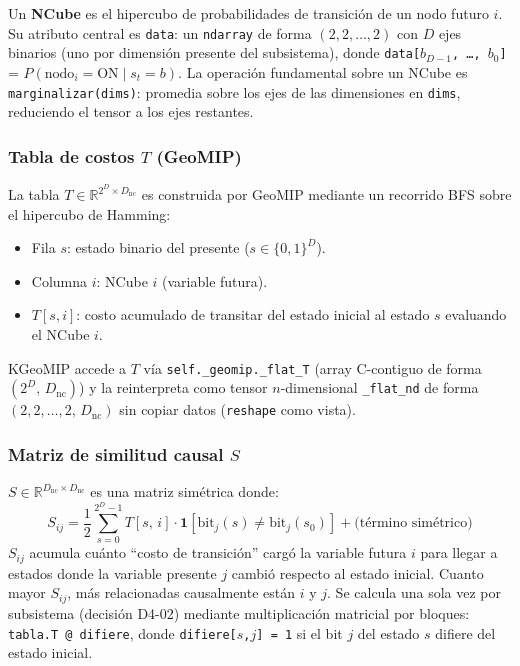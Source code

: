 Un \textbf{NCube} es el hipercubo de probabilidades de transición de un nodo futuro $i$.
Su atributo central es \texttt{data}: un \texttt{ndarray} de forma $(2, 2, \ldots, 2)$
con $D$ ejes binarios (uno por dimensión presente del subsistema), donde
\texttt{data[$b_{D-1}$, \ldots, $b_0$]} = $P(\text{nodo}_i = \text{ON} \mid s_t = b)$.
La operación fundamental sobre un NCube es \texttt{marginalizar(dims)}: promedia
sobre los ejes de las dimensiones en \texttt{dims}, reduciendo el tensor a los ejes
restantes.

\subsubsection*{Tabla de costos $T$ (GeoMIP)}

La tabla $T \in \mathbb{R}^{2^D \times D_{\text{nc}}}$ es construida por GeoMIP
mediante un recorrido BFS sobre el hipercubo de Hamming:
\begin{itemize}
  \item Fila $s$: estado binario del presente ($s \in \{0,1\}^D$).
  \item Columna $i$: NCube $i$ (variable futura).
  \item $T[s, i]$: costo acumulado de transitar del estado inicial al estado $s$
        evaluando el NCube $i$.
\end{itemize}
KGeoMIP accede a $T$ vía \texttt{self.\_geomip.\_flat\_T} (array C-contiguo de forma
$(2^D,\, D_{\text{nc}})$) y la reinterpreta como tensor $n$-dimensional
\texttt{\_flat\_nd} de forma $(2, 2, \ldots, 2,\, D_{\text{nc}})$ sin copiar datos
(\texttt{reshape} como vista).

\subsubsection*{Matriz de similitud causal $S$}

$S \in \mathbb{R}^{D_{\text{nc}} \times D_{\text{nc}}}$ es una matriz simétrica donde:
\begin{equation}
  S_{ij} = \frac{1}{2}\!\sum_{s=0}^{2^D - 1} T[s,\,i]
  \cdot \mathbf{1}\!\left[\text{bit}_j(s) \neq \text{bit}_j(s_0)\right]
  + \text{(término simétrico)}
  \label{eq:S}
\end{equation}
$S_{ij}$ acumula cuánto ``costo de transición'' cargó la variable futura $i$ para
llegar a estados donde la variable presente $j$ cambió respecto al estado inicial.
Cuanto mayor $S_{ij}$, más relacionadas causalmente están $i$ y $j$.
Se calcula una sola vez por subsistema (decisión D4-02) mediante multiplicación matricial
por bloques: \texttt{tabla.T @ difiere}, donde \texttt{difiere[$s$,$j$] = 1} si el bit
$j$ del estado $s$ difiere del estado inicial.

